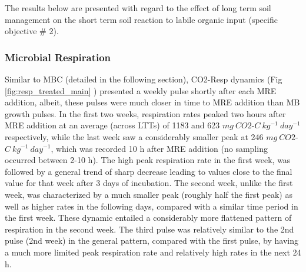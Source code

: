 		The results below are presented with regard to the effect of long term soil management on the short term soil reaction to labile organic input (specific objective \# 2).\\



		\subsubsection{Microbial Respiration}

		Similar to MBC (detailed in the following section), CO2-Resp dynamics (Fig \ref{fig:resp_treated_main} ) presented a weekly pulse shortly after each MRE addition, albeit, these pulses were much closer in time to MRE addition than MB growth pulses. In the first two weeks, respiration rates peaked two hours after MRE addition at an average (across LTTs) of 1183 and 623 $mg\ CO2$-$C\ kg^{-1}\ day^{-1}$ respectively, while the last week saw a considerably smaller peak at 246 $mg\ CO2$-$C\ kg^{-1}\ day^{-1}$, which was recorded 10 h after MRE addition (no sampling occurred between 2-10 h).
		The high peak respiration rate in the first week, was followed by a general trend of sharp decrease leading to values close to the final value for that week after 3 days of incubation. The second week, unlike the first week, was characterized by a much smaller peak (roughly half the first peak) as well as higher rates in the following days, compared with a similar time period in the first week. These dynamic entailed a considerably more flattened pattern of respiration in the second week. The third pulse was relatively similar to the 2nd pulse (2nd week) in the general pattern, compared with the first pulse, by having a much more limited peak respiration rate and relatively high rates in the next 24 h.\\


